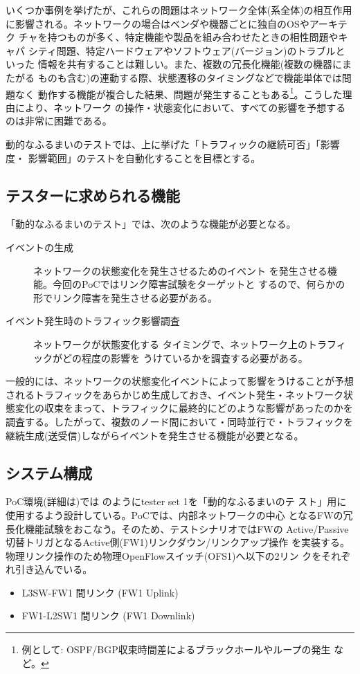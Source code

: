 いくつか事例を挙げたが、これらの問題はネットワーク全体(系全体)の相互作用
に影響される。ネットワークの場合はベンダや機器ごとに独自のOSやアーキテク
チャを持つものが多く、特定機能や製品を組み合わせたときの相性問題やキャパ
シティ問題、特定ハードウェアやソフトウェア(バージョン)のトラブルといった
情報を共有することは難しい。また、複数の冗長化機能(複数の機器にまたがる
ものも含む)の連動する際、状態遷移のタイミングなどで機能単体では問題なく
動作する機能が複合した結果、問題が発生することもある\footnote{例として:
OSPF/BGP収束時間差によるブラックホールやループの発生
\cite{j3g14-packet-forwarding}など。}。こうした理由により、ネットワーク
の操作・状態変化において、すべての影響を予想するのは非常に困難である。

動的なふるまいのテストでは、上に挙げた「トラフィックの継続可否」「影響度・
影響範囲」のテストを自動化することを目標とする。

  \subsection{テスターに求められる機能}

「動的なふるまいのテスト」では、次のような機能が必要となる。
\begin{description}
 \item[イベントの生成] ネットワークの状態変化を発生させるためのイベント
            を発生させる機能。今回のPoCではリンク障害試験をターゲットと
            するので、何らかの形でリンク障害を発生させる必要がある。
 \item[イベント発生時のトラフィック影響調査] ネットワークが状態変化する
            タイミングで、ネットワーク上のトラフィックがどの程度の影響を
            うけているかを調査する必要がある。
\end{description}

一般的には、ネットワークの状態変化イベントによって影響をうけることが予想
されるトラフィックをあらかじめ生成しておき、イベント発生・ネットワーク状
態変化の収束をまって、トラフィックに最終的にどのような影響があったのかを
調査する。したがって、複数のノード間において・同時並行で・トラフィックを
継続生成(送受信)しながらイベントを発生させる機能が必要となる。

  \subsection{システム構成}
PoC環境(詳細は)では
のようにtester set 1を「動的なふるまいのテ
スト」用に使用するよう設計している。PoCでは、\yo 内部ネットワークの中心
となるFWの冗長化機能試験をおこなう。そのため、テストシナリオではFWの
Active/Passive切替トリガとなるActive側(FW1)リンクダウン/リンクアップ操作
を実装する。物理リンク操作のため物理OpenFlowスイッチ(OFS1)へ以下の2リン
クをそれぞれ引き込んでいる。
\begin{itemize}
 \item L3SW-FW1 間リンク (FW1 Uplink)
 \item FW1-L2SW1 間リンク (FW1 Downlink)
\end{itemize}

